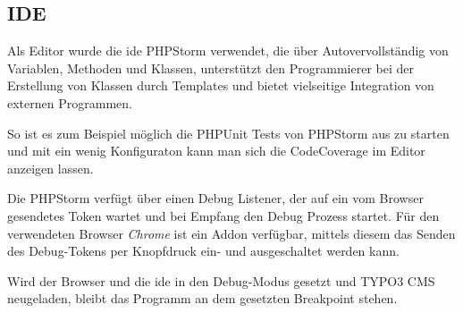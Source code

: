 \subsection{IDE}
Als Editor wurde die \gls{ide} PHPStorm verwendet, die über Autovervollständig von Variablen, Methoden und Klassen, unterstützt den Programmierer bei der Erstellung von Klassen durch Templates und bietet vielseitige Integration von externen Programmen.

So ist es zum Beispiel möglich die PHPUnit Tests von PHPStorm aus zu starten und mit ein wenig Konfiguraton \cite{web:kowalke14} kann man sich die CodeCoverage im Editor anzeigen lassen.

Die PHPStorm verfügt über einen Debug Listener, der auf ein vom Browser gesendetes Token wartet und bei Empfang den Debug Prozess startet. Für den verwendeten Browser \textit{Chrome} ist ein Addon verfügbar, mittels diesem das Senden des Debug-Tokens per Knopfdruck ein- und ausgeschaltet werden kann.

Wird der Browser und die \gls{ide} in den Debug-Modus gesetzt und TYPO3 CMS neugeladen, bleibt das Programm an dem gesetzten Breakpoint stehen.
